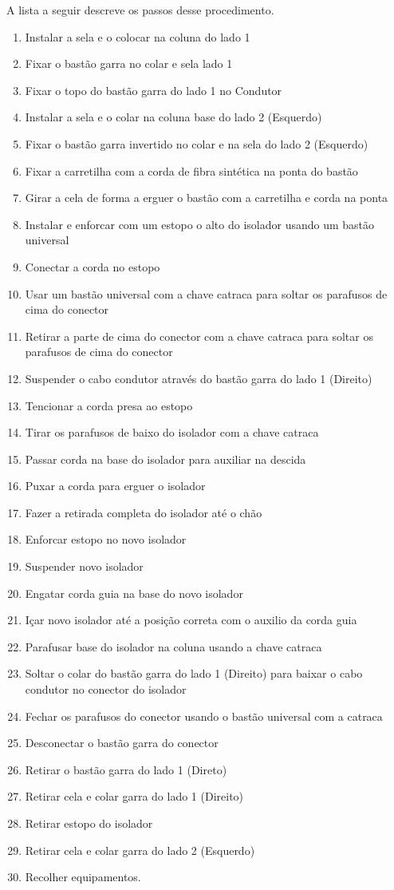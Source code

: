 A lista a seguir descreve os passos desse procedimento.
\begin{enumerate}
	\item Instalar a sela e o colocar na coluna do lado 1
	\item Fixar o bastão garra no colar e sela lado 1
	\item Fixar o topo do bastão garra do lado 1 no Condutor
	\item Instalar a sela e o colar na coluna base do lado 2 (Esquerdo)
	\item Fixar o bastão garra invertido no colar e na sela do lado 2 (Esquerdo)
	\item Fixar a carretilha com a corda de fibra sintética na ponta do bastão
	\item Girar a cela de forma a erguer o bastão com a carretilha e corda na ponta
	\item Instalar e enforcar com um estopo o alto do isolador usando um bastão universal
	\item Conectar a corda no estopo
	\item Usar um bastão universal com a chave catraca para soltar os parafusos de cima do conector
	\item Retirar a parte de cima do conector com a chave catraca para soltar os parafusos de cima do conector
	\item Suspender o cabo condutor através do bastão garra do lado 1 (Direito)
	\item Tencionar a corda presa ao estopo
	\item Tirar os parafusos de baixo do isolador com a chave catraca
	\item Passar corda na base do isolador para auxiliar na descida
	\item Puxar a corda para erguer o isolador 
	\item Fazer a retirada completa do isolador até o chão
	\item Enforcar estopo no novo isolador
	\item Suspender novo isolador
	\item Engatar corda guia na base do novo isolador
	\item Içar novo isolador até a posição correta com o auxilio da corda guia
	\item Parafusar base do isolador na coluna usando a chave catraca
	\item Soltar o colar do bastão garra do lado 1 (Direito) para baixar o cabo condutor no conector do isolador
	\item Fechar os parafusos do conector usando o bastão universal com  a catraca
	\item Desconectar o bastão garra do conector
	\item Retirar o bastão garra do lado 1 (Direto)
	\item Retirar cela e colar garra do lado 1 (Direito)
	\item Retirar estopo do isolador
	\item Retirar cela e colar garra do lado 2 (Esquerdo)
	\item Recolher equipamentos.
\end{enumerate}

